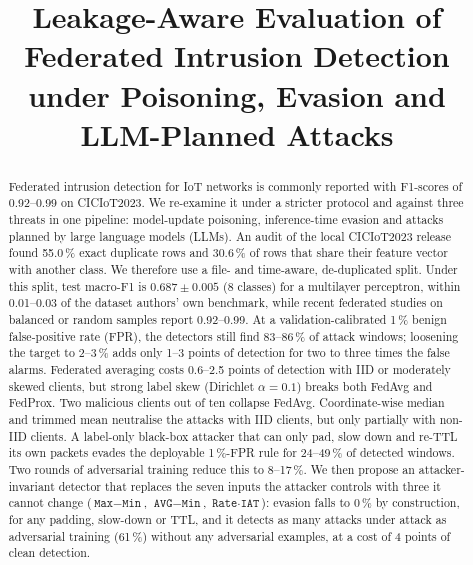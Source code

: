 \documentclass[conference]{IEEEtran}
\begin{document}
\title{Leakage-Aware Evaluation of Federated Intrusion Detection under Poisoning, Evasion and LLM-Planned Attacks}

\author{
}

\maketitle

\begin{abstract}
Federated intrusion detection for IoT networks is commonly reported with F1-scores of 0.92--0.99 on CICIoT2023. We re-examine it under a stricter protocol and against three threats in one pipeline: model-update poisoning, inference-time evasion and attacks planned by large language models (LLMs).
An audit of the local CICIoT2023 release found 55.0\,\% exact duplicate rows and 30.6\,\% of rows that share their feature vector with another class. We therefore use a file- and time-aware, de-duplicated split.
Under this split, test macro-F1 is $0.687\pm0.005$ (8 classes) for a multilayer perceptron, within 0.01--0.03 of the dataset authors' own benchmark, while recent federated studies on balanced or random samples report 0.92--0.99. At a validation-calibrated 1\,\% benign false-positive rate (FPR), the detectors still find 83--86\,\% of attack windows; loosening the target to 2--3\,\% adds only 1--3 points of detection for two to three times the false alarms.
Federated averaging costs 0.6--2.5 points of detection with IID or moderately skewed clients, but strong label skew (Dirichlet $\alpha=0.1$) breaks both FedAvg and FedProx.
Two malicious clients out of ten collapse FedAvg. Coordinate-wise median and trimmed mean neutralise the attacks with IID clients, but only partially with non-IID clients.
A label-only black-box attacker that can only pad, slow down and re-TTL its own packets evades the deployable 1\,\%-FPR rule for 24--49\,\% of detected windows. Two rounds of adversarial training reduce this to 8--17\,\%. We then propose an attacker-invariant detector that replaces the seven inputs the attacker controls with three it cannot change ($\texttt{Max}-\texttt{Min}$, $\texttt{AVG}-\texttt{Min}$, $\texttt{Rate}\cdot\texttt{IAT}$): evasion falls to 0\,\% by construction, for any padding, slow-down or TTL, and it detects as many attacks under attack as adversarial training (61\,\%) without any adversarial examples, at a cost of 4 points of clean detection.

\end{abstract}
\end{document}
